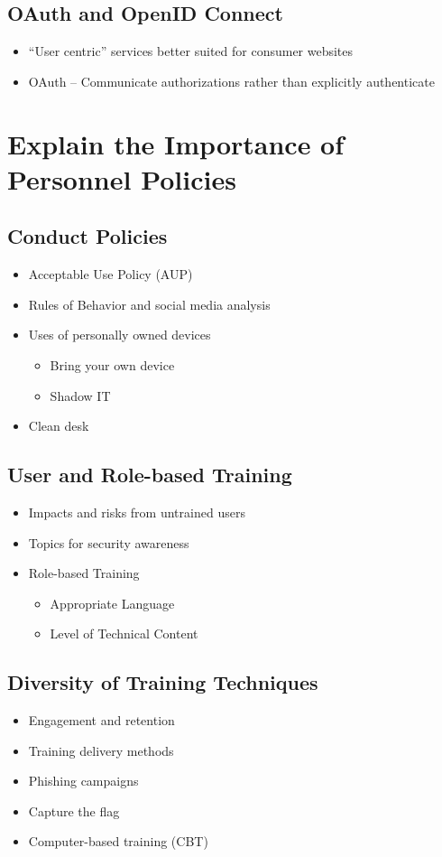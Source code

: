 	\subsection {OAuth and OpenID Connect}
		\begin{itemize}
			\item ``User centric'' services better suited for consumer websites
			\item OAuth -- Communicate authorizations rather than explicitly authenticate
		\end{itemize}

\section {Explain the Importance of Personnel Policies}
	\subsection{Conduct Policies}
		\begin{itemize}
			\item Acceptable Use Policy (AUP)
			\item Rules of Behavior and social media analysis
			\item Uses of personally owned devices
				\begin{itemize}
					\item Bring your own device
					\item Shadow IT
				\end{itemize}
			\item Clean desk
		\end{itemize}
	\subsection {User and Role-based Training}
		\begin{itemize}
			\item Impacts and risks from untrained users
			\item Topics for security awareness
			\item Role-based Training
				\begin{itemize}
					\item Appropriate Language
					\item Level of Technical Content
				\end{itemize}
		\end{itemize}
	\subsection {Diversity of Training Techniques}
		\begin{itemize}
			\item Engagement and retention
			\item Training delivery methods
			\item Phishing campaigns
			\item Capture the flag
			\item Computer-based training (CBT)
		\end{itemize}

